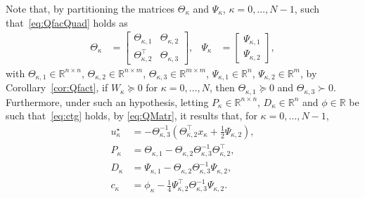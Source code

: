 \documentclass[10pt]{IEEEtran}      %
\newcommand{\R}{\mathbb{R}}
\theoremstyle{theorem}
\theoremstyle{remark}
\begin{document}
Note that, by partitioning the matrices $\Theta_\kappa$ and $\Psi_\kappa$, $\kappa=0,\dots,N-1$, such that~\eqref{eq:QfacQuad} holds as
\begin{align}\label{eq:partition}
\Theta_\kappa&=\left[\begin{array}{cc}
\Theta_{\kappa,1} & \Theta_{\kappa,2}\\
\Theta_{\kappa,2}^\top & \Theta_{\kappa,3}
\end{array}\right], &
\Psi_\kappa &= \left[\begin{array}{c}
\Psi_{\kappa,1}\\
\Psi_{\kappa,2}
\end{array}\right],
\end{align}
with $\Theta_{\kappa,1}\in\R^{n\times n}$, $\Theta_{\kappa,2}\in\R^{n\times m}$, $\Theta_{\kappa,3}\in\R^{m\times m}$, 
$\Psi_{\kappa,1}\in\R^n$, $\Psi_{\kappa,2}\in\R^m$,
by Corollary~\ref{cor:Qfact}, if $W_\kappa \succeq 0$ for $\kappa=0,\dots,N$, then $\Theta_{\kappa,1}\succeq 0$
and $\Theta_{\kappa,3}\succ 0$. Furthermore, under such an hypothesis, letting $P_\kappa\in\R^{n\times n}$,
$D_\kappa\in\R^{n}$ and $\phi\in\R$ be such that~\eqref{eq:ctg} holds, by \eqref{eq:QMatr}, it results that,  for  $\kappa=0,\dots,N-1$,
\begin{subequations}
\label{eq:optimMatr}%
\begin{align}
u_\kappa^\star&=-\Theta_{\kappa,3}^{-1}(\Theta_{\kappa,2}^\top x_\kappa+\tfrac{1}{2}\Psi_{\kappa,2}),\label{eq:optContS}\\
P_{\kappa} & = \Theta_{\kappa,1} - \Theta_{\kappa,2}\Theta_{\kappa,3}^{-1}\Theta_{\kappa,2}^\top,\\
D_{\kappa} & =\Psi_{\kappa,1}-\Theta_{\kappa,2}\Theta_{\kappa,3}^{-1}\Psi_{\kappa,2},\\
c_{\kappa} & = \phi_\kappa - \tfrac{1}{4}\Psi_{\kappa,2}^\top\Theta_{\kappa,3}^{-1}\Psi_{\kappa,2}.
\end{align}
\end{subequations}
\end{document}
